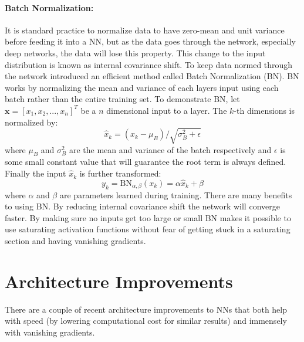 \paragraph{Batch Normalization:}
It is standard practice to normalize data to have zero-mean and unit variance before feeding it into a NN, but as the data goes through the network, especially deep networks, the data will lose this property. 
This change to the input distribution is known as internal covariance shift. 
To keep data normed through the network \cite{ioffe2015batch} introduced an efficient method called Batch Normalization (BN). 
BN works by normalizing the mean and variance of each layers input using each batch rather than the entire training set. 
To demonstrate BN, let $\textbf{x} = [x_1,x_2,...,x_n]^T$ be a $n$ dimensional input to a layer. 
The $k$-th dimensions is normalized by:
\begin{equation}
\hat{x}_k = (x_k - \mu_{B})/\sqrt{\sigma^2_B + \epsilon}
\label{eq:BN1}
\end{equation}
where $\mu_{B}$ and $\sigma^2_B$ are the mean and variance of the batch respectively and $\epsilon$ is some small constant value that will guarantee the root term is always defined. 
Finally the input $\hat{x}_k$ is further transformed:
\begin{equation}
y_k = \mbox{BN}_{\alpha,\beta}(x_k) = \alpha \hat{x}_k + \beta
\label{eq:BN2}
\end{equation}
where $\alpha$ and $\beta$ are parameters learned during training. 
There are many benefits to using BN. 
By reducing internal covariance shift the network will converge faster. 
By making sure no inputs get too large or small BN makes it possible to use saturating activation functions without fear of getting stuck in a saturating section and having vanishing gradients.

\section{Architecture Improvements}
There are a couple of recent architecture improvements to NNs that both help with speed (by lowering computational cost for similar results) and immensely with vanishing gradients.

